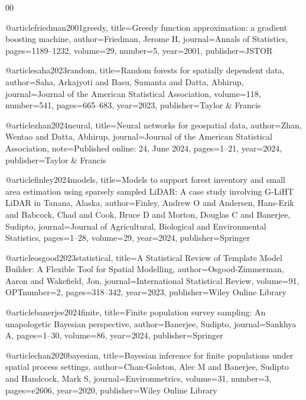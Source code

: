 \documentclass[preprint,12pt]{elsarticle}
\begin{document}
\begin{thebibliography}{00}


@article{friedman2001greedy,
  title={{Greedy function approximation: a gradient boosting machine}},
  author={Friedman, Jerome H},
  journal={Annals of Statistics},
  pages={1189--1232},
volume={29},
number={5},
  year={2001},
  publisher={JSTOR}
}

@article{saha2023random,
  title={Random forests for spatially dependent data},
  author={Saha, Arkajyoti and Basu, Sumanta and Datta, Abhirup},
  journal={Journal of the American Statistical Association},
  volume={118},
  number={541},
  pages={665--683},
  year={2023},
  publisher={Taylor \& Francis}
}

@article{zhan2024neural,
  title={Neural networks for geospatial data},
  author={Zhan, Wentao and Datta, Abhirup},
  journal={Journal of the American Statistical Association},
  note={Published online: 24, June 2024},
  pages={1--21},
  year={2024},
  publisher={Taylor \& Francis}
}

@article{finley2024models,
  title={Models to support forest inventory and small area estimation using sparsely sampled {LiDAR}: A case study involving {G-LiHT} {LiDAR} in {T}anana, {A}laska},
  author={Finley, Andrew O and Andersen, Hans-Erik and Babcock, Chad and Cook, Bruce D and Morton, Douglas C and Banerjee, Sudipto},
  journal={Journal of Agricultural, Biological and Environmental Statistics},
  pages={1--28},
  volume={29},
  year={2024},
  publisher={Springer}
}

@article{osgood2023statistical,
  title={A Statistical Review of Template Model Builder: A Flexible Tool for Spatial Modelling},
  author={Osgood-Zimmerman, Aaron and Wakefield, Jon},
  journal={International Statistical Review},
  volume={91},
  OPTnumber={2},
  pages={318--342},
  year={2023},
  publisher={Wiley Online Library}
}

@article{banerjee2024finite,
  title={Finite population survey sampling: An unapologetic Bayesian perspective},
  author={Banerjee, Sudipto},
  journal={Sankhya A},
  pages={1--30},
volume={86},
  year={2024},
  publisher={Springer}
}


@article{chan2020bayesian,
  title={Bayesian inference for finite populations under spatial process settings},
  author={Chan-Golston, Alec M and Banerjee, Sudipto and Handcock, Mark S},
  journal={Environmetrics},
  volume={31},
  number={3},
  pages={e2606},
  year={2020},
  publisher={Wiley Online Library}
}


\end{thebibliography}
\end{document}
